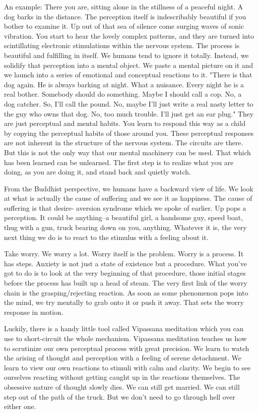 An example: There you are, sitting alone in the stillness of a peaceful night. A
dog barks in the distance. The perception itself is indescribably beautiful if
you bother to examine it. Up out of that sea of silence come surging waves of
sonic vibration. You start to hear the lovely complex patterns, and they are
turned into scintillating electronic stimulations within the nervous system. The
process is beautiful and fulfilling in itself. We humans tend to ignore it
totally. Instead, we solidify that perception into a mental object. We paste a
mental picture on it and we launch into a series of emotional and conceptual
reactions to it. "There is that dog again. He is always barking at night. What a
nuisance. Every night he is a real bother. Somebody should do something. Maybe I
should call a cop. No, a dog catcher. So, I'll call the pound. No, maybe I'll
just write a real nasty letter to the guy who owns that dog. No, too much
trouble. I'll just get an ear plug." They are just perceptual and mental habits.
You learn to respond this way as a child by copying the perceptual habits of
those around you. These perceptual responses are not inherent in the structure
of the nervous system. The circuits are there. But this is not the only way that
our mental machinery can be used. That which has been learned can be unlearned.
The first step is to realize what you are doing, as you are doing it, and stand
back and quietly watch.

From the Buddhist perspective, we humans have a backward view of life. We look
at what is actually the cause of suffering and we see it as happiness. The cause
of suffering is that desire- aversion syndrome which we spoke of earlier. Up
pops a perception. It could be anything--a beautiful girl, a handsome guy, speed
boat, thug with a gun, truck bearing down on you, anything. Whatever it is, the
very next thing we do is to react to the stimulus with a feeling about it.

Take worry. We worry a lot. Worry itself is the problem. Worry is a process. It
has steps. Anxiety is not just a state of existence but a procedure. What you've
got to do is to look at the very beginning of that procedure, those initial
stages before the process has built up a head of steam. The very first link of
the worry chain is the grasping/rejecting reaction. As soon as some phenomenon
pops into the mind, we try mentally to grab onto it or push it away. That sets
the worry response in motion.

Luckily, there is a handy little tool called Vipassana meditation which you can
use to short-circuit the whole mechanism.
Vipassana meditation teaches us how to scrutinize our own perceptual process with great precision. We learn to watch the arising
of thought and perception with a feeling of serene detachment. We learn to view our own reactions to stimuli with calm and
clarity. We begin to see ourselves reacting without getting caught up in the reactions themselves. The obsessive nature of thought
slowly dies. We can still get married. We can still step out of the path of the truck. But we don't need to go through hell over
either one.

